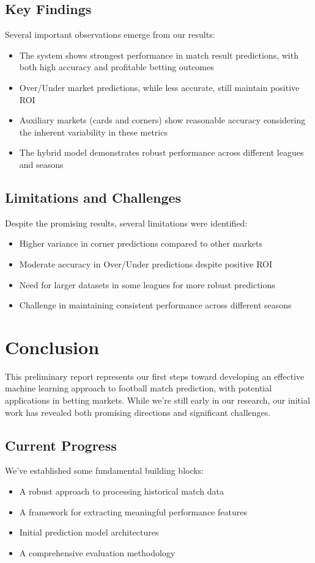 \documentclass[conference]{IEEEtran}
\begin{document}
\subsection{Key Findings}
Several important observations emerge from our results:

\begin{itemize}
\item The system shows strongest performance in match result predictions, with both high accuracy and profitable betting outcomes
\item Over/Under market predictions, while less accurate, still maintain positive ROI
\item Auxiliary markets (cards and corners) show reasonable accuracy considering the inherent variability in these metrics
\item The hybrid model demonstrates robust performance across different leagues and seasons
\end{itemize}

\subsection{Limitations and Challenges}
Despite the promising results, several limitations were identified:

\begin{itemize}
\item Higher variance in corner predictions compared to other markets
\item Moderate accuracy in Over/Under predictions despite positive ROI
\item Need for larger datasets in some leagues for more robust predictions
\item Challenge in maintaining consistent performance across different seasons
\end{itemize}

\section{Conclusion}
This preliminary report represents our first steps toward developing an effective machine learning approach to football match prediction, with potential applications in betting markets. While we're still early in our research, our initial work has revealed both promising directions and significant challenges.

\subsection{Current Progress}
We've established some fundamental building blocks:
\begin{itemize}
\item A robust approach to processing historical match data
\item A framework for extracting meaningful performance features
\item Initial prediction model architectures
\item A comprehensive evaluation methodology
\end{itemize}
\end{document}
